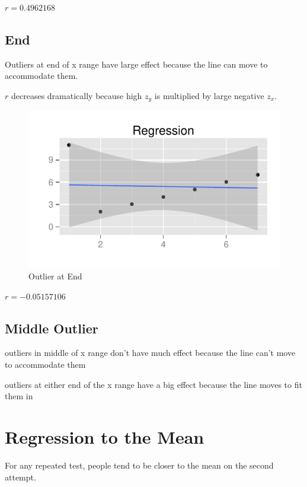 \documentclass[letterpaper, landscape]{exam}
\begin{document}
  $r = 0.4962168$

  \subsection{End}

  Outliers at end of x range have large effect because the line can move to
  accommodate them.  
  
  $r$ decreases dramatically because high $z_y$ is multiplied by
  large negative $z_x$.

  \begin{figure}[H]
    \centering
    \includegraphics{figures/end_outlier.pdf}
    \caption{Outlier at End}
  \end{figure}

  $r = -0.05157106$

  \subsection{Middle Outlier}
  \begin{itemize*}
    \item outliers in middle of x range don't have much effect because the line can't
      move to accommodate them

    \item outliers at either end of the x range have a big effect because the line
      moves to fit them in
  \end{itemize*}

  \section{Regression to the Mean}
  For any repeated test, people tend to be closer to the mean on the second
  attempt.
\end{document}

